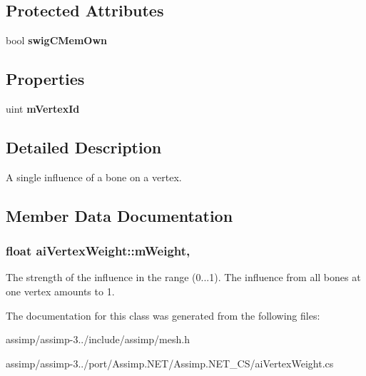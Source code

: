 \subsection*{Protected Attributes}
\begin{DoxyCompactItemize}
\item 
\hypertarget{structai_vertex_weight_a6aadf83ecfbd829d1b5f426447f48ccf}{bool {\bfseries swig\+C\+Mem\+Own}}\label{structai_vertex_weight_a6aadf83ecfbd829d1b5f426447f48ccf}

\end{DoxyCompactItemize}
\subsection*{Properties}
\begin{DoxyCompactItemize}
\item 
\hypertarget{structai_vertex_weight_a83135ae379bdbded822bc648b6cf7894}{uint {\bfseries m\+Vertex\+Id}}\label{structai_vertex_weight_a83135ae379bdbded822bc648b6cf7894}

\end{DoxyCompactItemize}


\subsection{Detailed Description}
A single influence of a bone on a vertex. 

\subsection{Member Data Documentation}
\hypertarget{structai_vertex_weight_abab9c49baabc2cafef9ac840f59e61b8}{
\subsubsection[{m\+Weight}]{\setlength{\rightskip}{0pt plus 5cm}float ai\+Vertex\+Weight\+::m\+Weight\hspace{0.3cm}{\ttfamily [get]}, {\ttfamily [set]}}}\label{structai_vertex_weight_abab9c49baabc2cafef9ac840f59e61b8}
The strength of the influence in the range (0...1). The influence from all bones at one vertex amounts to 1. 

The documentation for this class was generated from the following files\+:\begin{DoxyCompactItemize}
\item 
assimp/assimp-\/3../include/assimp/mesh.\+h\item 
assimp/assimp-\/3../port/\+Assimp.\+N\+E\+T/\+Assimp.\+N\+E\+T\+\_\+\+C\+S/ai\+Vertex\+Weight.\+cs\end{DoxyCompactItemize}
